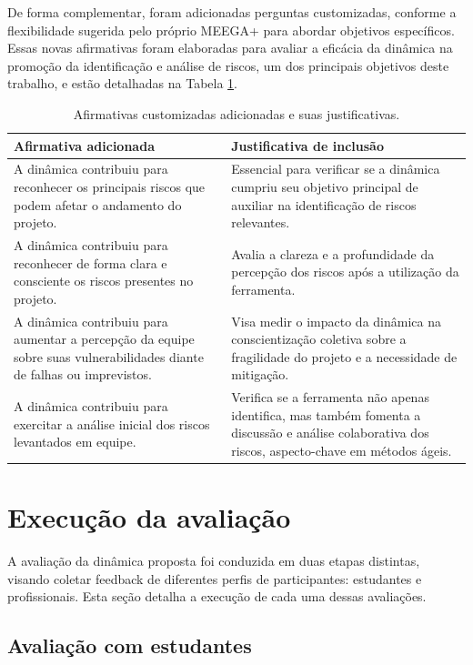 \documentclass[
	12pt,
	openright,
	twoside,
	a4paper,
	english,
	brazil
	]{abntex2}
\begin{document}
De forma complementar, foram adicionadas perguntas customizadas, conforme a flexibilidade sugerida pelo próprio MEEGA+ para abordar objetivos específicos. Essas novas afirmativas foram elaboradas para avaliar a eficácia da dinâmica na promoção da identificação e análise de riscos, um dos principais objetivos deste trabalho, e estão detalhadas na Tabela \ref{tab:afirmativas-adicionadas}.

\begin{table}[h!]
  \centering
  \caption{Afirmativas customizadas adicionadas e suas justificativas.}
  \label{tab:afirmativas-adicionadas}
  \begin{tabular}{|p{}|p{}|}
  \hline
  \textbf{Afirmativa adicionada} & \textbf{Justificativa de inclusão} \\ \hline
  A dinâmica contribuiu para reconhecer os principais riscos que podem afetar o andamento do projeto. & Essencial para verificar se a dinâmica cumpriu seu objetivo principal de auxiliar na identificação de riscos relevantes. \\ \hline
  A dinâmica contribuiu para reconhecer de forma clara e consciente os riscos presentes no projeto. & Avalia a clareza e a profundidade da percepção dos riscos após a utilização da ferramenta. \\ \hline
  A dinâmica contribuiu para aumentar a percepção da equipe sobre suas vulnerabilidades diante de falhas ou imprevistos. & Visa medir o impacto da dinâmica na conscientização coletiva sobre a fragilidade do projeto e a necessidade de mitigação. \\ \hline
  A dinâmica contribuiu para exercitar a análise inicial dos riscos levantados em equipe. & Verifica se a ferramenta não apenas identifica, mas também fomenta a discussão e análise colaborativa dos riscos, aspecto-chave em métodos ágeis. \\ \hline
  \end{tabular}
\end{table}

\section{Execução da avaliação}

A avaliação da dinâmica proposta foi conduzida em duas etapas distintas, visando coletar feedback de diferentes perfis de participantes: estudantes e profissionais. Esta seção detalha a execução de cada uma dessas avaliações.

\subsection{Avaliação com estudantes}
\end{document}
